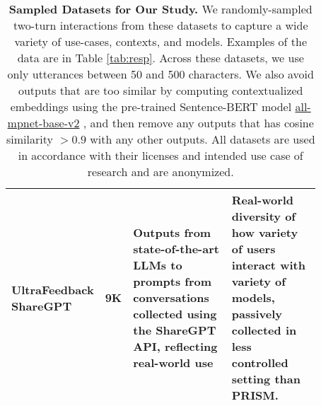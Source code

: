 \documentclass[11pt]{article}
\begin{document}
\begin{table*}[th]
\begin{tabular}{|p{0.15\linewidth}|p{0.02\linewidth}|p{0.35\linewidth}|p{0.35\linewidth}|}
UltraFeedback ShareGPT           \cite{pmlr-v235-cui24f}                                       & 9K   & Outputs from state-of-the-art LLMs to prompts from conversations collected using the ShareGPT API, reflecting real-world use                                          & Real-world diversity of how variety of users interact with variety of models, passively collected in less controlled setting than PRISM.       \\\hline                       
\end{tabular}
\caption{\textbf{Sampled Datasets for Our Study.} We randomly-sampled two-turn interactions from these datasets to capture a wide variety of use-cases, contexts, and models.  Examples of the data are in Table \ref{tab:resp}. Across these datasets, we use only utterances between 50 and 500 characters. We also avoid outputs that are too similar by computing contextualized
embeddings using the pre-trained Sentence-BERT
model \href{https://huggingface.co/sentence-transformers/all-mpnet-base-v2}{all-mpnet-base-v2} \cite{reimers-gurevych-2019-sentence}, and then remove any outputs that has cosine similarity $>0.9$ with any other outputs. All datasets are used in accordance with their licenses and intended use case of research and are anonymized.}
\label{tab:data}
\end{table*}
\end{document}

